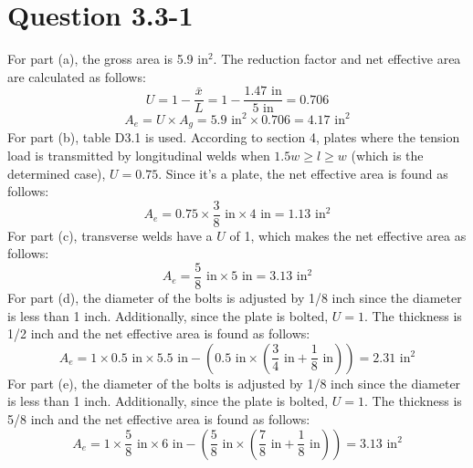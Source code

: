 \documentclass{article}
\begin{document}
\section*{Question 3.3-1}
For part (a), the gross area is 5.9$\text{ in}^2$. The reduction factor and net effective area are calculated as follows: 
\[U = 1-\frac{\bar{x}}{L}=1-\frac{1.47\text{ in}}{5\text{ in}}=0.706\]  
\[A_e=U\times A_g=5.9\text{ in}^2\times 0.706 = \boxed{4.17\text{ in}^2}\]  
For part (b), table D3.1 is used. According to section 4, plates where the tension load is transmitted by longitudinal welds when $1.5w\geq l\geq w$ (which is the determined case), $U=0.75$. Since it's a plate, the net effective area is found as follows: 
\[A_e=0.75\times \frac{3}{8}\text{ in}\times 4\text{ in}= \boxed{1.13 \text{ in}^2}\] 
For part (c), transverse welds have a $U$ of 1, which makes the net effective area as follows: 
\[A_e=\frac{5}{8}\text{ in}\times 5\text{ in}= \boxed{3.13 \text{ in}^2}\] 
For part (d), the diameter of the bolts is adjusted by 1/8 inch since the diameter is less than 1 inch. Additionally, since the plate is bolted, $U=1$. The thickness is 1/2 inch and the net effective area is found as follows: 
\[A_e=1\times0.5\text{ in}\times 5.5\text{ in}-\left(0.5\text{ in}\times\left(\frac{3}{4}\text{ in}+\frac{1}{8}\text{ in}\right)\right)=\boxed{2.31\text{ in}^2}\]
For part (e), the diameter of the bolts is adjusted by 1/8 inch since the diameter is less than 1 inch. Additionally, since the plate is bolted, $U=1$. The thickness is 5/8 inch and the net effective area is found as follows: 
\[A_e=1\times\frac{5}{8}\text{ in}\times 6\text{ in}-\left(\frac{5}{8}\text{ in}\times\left(\frac{7}{8}\text{ in}+\frac{1}{8}\text{ in}\right)\right)=\boxed{3.13\text{ in}^2}\]
\end{document}
